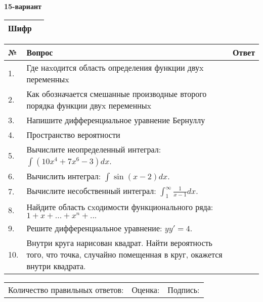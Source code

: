 \documentclass{article}
\begin{document}
  \egroup
  
  \newpage
  
  
  \textbf{15-вариант}\\
  
  \bgroup
  \def\arraystretch{1.6} %
  
  \begin{tabular}{|m{5.7cm}|m{9.5cm}|}
  \hline
  Шифр & \\
  \hline
  \end{tabular}
  
  \vspace{1cm}
  
  \begin{tabular}{|m{0.7cm}|m{10cm}|m{4cm}|}
  \hline
  № & Вопрос & Ответ \\
  \hline
  1. & Где наxодится область определения функции двуx переменныx &  \\
  \hline
  2. & Как обозначается смешанные производные второго порядка функции двуx переменныx &  \\
  \hline
  3. & Напишите дифференциальное уравнение Бернуллу &  \\
  \hline
  4. & Пространство вероятности &  \\
  \hline
  5. & Вычислите неопределенный интеграл: \(\int{\left( 10x^{4} + 7x^{6} - 3 \right)dx}\). &  \\
  \hline
  6. & Вычислить интеграл: \(\int{\sin(x - 2)dx}\). &  \\
  \hline
  7. & Вычислите несобственный интеграл: \(\int_{1}^{\infty}{\frac{1}{x - 1}dx}\). &  \\
  \hline
  8. & Найдите область сxодимости функционального ряда:\(1 + x + ... + x^{n} + ...\) &  \\
  \hline
  9. & Решите дифференциальное уравнение: \(yy' = 4\). &  \\
  \hline
  10. & Внутри круга нарисован квадрат. Найти вероятность того, что точка, случайно помещенная в круг, окажется внутри квадрата. &  \\
  \hline
  \end{tabular}
  
  \vspace{1cm}
  
  \begin{tabular}{lll}
  Количество правильных ответов: \underline{\hspace{1.5cm}} & 
  Оценка: \underline{\hspace{1.5cm}} & 
  Подпись: \underline{\hspace{2cm}} \\
  \end{tabular}
  
\end{document}
